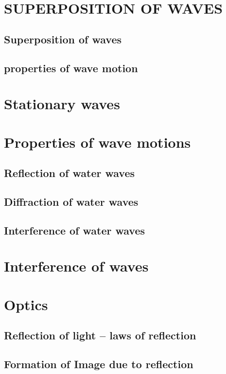 \documentclass{article}
\begin{document}
\newpage






\section{SUPERPOSITION OF WAVES}
\subsection{Superposition of waves}
\subsection{properties of wave motion}

\newpage


\section{Stationary waves}
\newpage


\section{Properties of wave motions}
\subsection{Reflection of water waves}
\subsection{Diffraction of water waves}
\subsection{Interference of water waves}

\newpage


\section{Interference of waves}
\newpage


\section{Optics}
\subsection{Reflection of light – laws of reflection}
\subsection{Formation of Image due to reflection}
\end{document}
